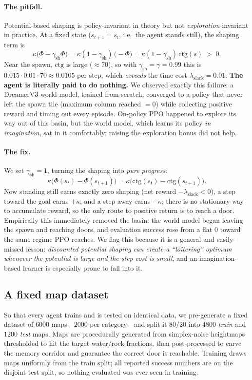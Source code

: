 \documentclass[11pt]{article}
\newcommand{\ctg}{\mathrm{ctg}}
\begin{document}
\paragraph{The pitfall.} Potential-based shaping is policy-invariant in theory
but not \emph{exploration}-invariant in practice. At a fixed state
($s_{t+1}=s_t$, i.e.\ the agent stands still), the shaping term is
\begin{equation}
\kappa\big(\Phi - \gamma_{\!\text{sh}}\Phi\big)
= \kappa(1-\gamma_{\!\text{sh}})\,\big(-\Phi\big)
= \kappa(1-\gamma_{\!\text{sh}})\,\ctg(s) \;>\; 0 .
\end{equation}
Near the spawn, $\ctg$ is large ($\approx 70$), so with $\gamma_{\!\text{sh}}
=\gamma=0.99$ this is $0.015\cdot0.01\cdot70 \approx 0.0105$ per step, which
\emph{exceeds} the time cost $\lambda_{\text{slack}}=0.01$. \textbf{The agent is
literally paid to do nothing.} We observed exactly this failure: a DreamerV3
world model, trained from scratch, converged to a policy that never left the
spawn tile (maximum column reached $=0$) while collecting positive reward and
timing out every episode. On-policy PPO happened to explore its way out of this
basin, but the world model, which learns its policy \emph{in imagination}, sat
in it comfortably; raising the exploration bonus did not help.

\paragraph{The fix.} We set $\gamma_{\!\text{sh}}=1$, turning the shaping into
\emph{pure progress}:
\begin{equation}
\kappa\big(\Phi(s_t)-\Phi(s_{t+1})\big)
= \kappa\big(\ctg(s_t)-\ctg(s_{t+1})\big).
\end{equation}
Now standing still earns exactly zero shaping (net reward $-\lambda_{\text{slack}}
<0$), a step toward the goal earns $+\kappa$, and a step away earns $-\kappa$;
there is no stationary way to accumulate reward, so the only route to positive
return is to reach a door. Empirically this immediately removed the basin: the
world model began leaving the spawn and reaching doors, and evaluation success
rose from a flat $0$ toward the same regime PPO reaches. We flag this because it
is a general and easily-missed lesson: \emph{discounted potential shaping can
create a ``loitering'' optimum whenever the potential is large and the step cost
is small}, and an imagination-based learner is especially prone to fall into it.

\subsection{A fixed map dataset}
So that every agent trains and is tested on identical data, we pre-generate a
fixed dataset of $6000$ maps---$2000$ per category---and split it $80/20$ into
$4800$ \emph{train} and $1200$ \emph{test} maps. Maps are procedurally generated
from simplex-noise heightmaps thresholded to hit the target water/rock fractions,
then post-processed to carve the memory corridor and guarantee the correct door
is reachable. Training draws maps uniformly from the train split; all reported
success numbers are on the disjoint test split, so nothing evaluated was ever
seen in training.
\end{document}
